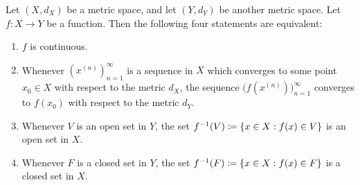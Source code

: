 \begin{thm}\label{2.1.5}
  Let \((X, d_X)\) be a metric space, and let \((Y, d_Y)\) be another metric space.
  Let \(f : X \to Y\) be a function.
  Then the following four statements are equivalent:
  \begin{enumerate}
    \item \(f\) is continuous.
    \item Whenever \((x^{(n)})_{n = 1}^\infty\) is a sequence in \(X\) which converges to some point \(x_0 \in X\) with respect to the metric \(d_X\), the sequence \(\big(f(x^{(n)})\big)_{n = 1}^\infty\) converges to \(f(x_0)\) with respect to the metric \(d_Y\).
    \item Whenever \(V\) is an open set in \(Y\), the set \(f^{-1}(V) \coloneqq \left\lbrace x \in X : f(x) \in V\right\rbrace\) is an open set in \(X\).
    \item Whenever \(F\) is a closed set in \(Y\), the set \(f^{-1}(F) \coloneqq \left\lbrace x \in X : f(x) \in F\right\rbrace\) is a closed set in \(X\).
  \end{enumerate}
\end{thm}

